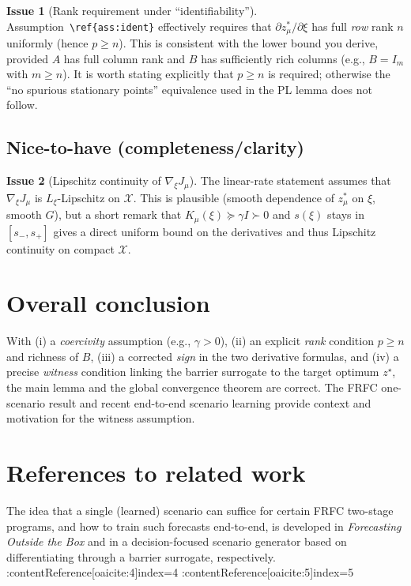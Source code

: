 \documentclass[11pt]{article}
\theoremstyle{definition}
\newtheorem{issue}{Issue}
\begin{document}
\begin{issue}[Rank requirement under ``identifiability'']
Assumption~\texttt{\textbackslash ref\{ass:ident\}} effectively requires that $\partial z_\mu^*/\partial \xi$ has full \emph{row} rank $n$ uniformly (hence $p\ge n$). This is consistent with the lower bound you derive, provided $A$ has full column rank and $B$ has sufficiently rich columns (e.g., $B=I_m$ with $m\ge n$). It is worth stating explicitly that $p\ge n$ is required; otherwise the ``no spurious stationary points'' equivalence used in the PL lemma does not follow.
\end{issue}

\subsection*{Nice-to-have (completeness/clarity)}
\begin{issue}[Lipschitz continuity of $\nabla_\xi J_\mu$]
The linear-rate statement assumes that $\nabla_\xi J_\mu$ is $L_\xi$-Lipschitz on $\mathcal X$. This is plausible (smooth dependence of $z^*_\mu$ on $\xi$, smooth $G$), but a short remark that $K_\mu(\xi)\succeq \gamma I\succ0$ and $s(\xi)$ stays in $[s_-,s_+]$ gives a direct uniform bound on the derivatives and thus Lipschitz continuity on compact $\mathcal X$. 
\end{issue}

\section*{Overall conclusion}
With (i) a \emph{coercivity} assumption (e.g., $\gamma>0$), (ii) an explicit \emph{rank} condition $p\ge n$ and richness of $B$, (iii) a corrected \emph{sign} in the two derivative formulas, and (iv) a precise \emph{witness} condition linking the barrier surrogate to the target optimum $z^\star$, the main lemma and the global convergence theorem are correct. The FRFC one-scenario result \cite{FOTB} and recent end-to-end scenario learning \cite{DFS} provide context and motivation for the witness assumption.

\section*{References to related work}
The idea that a single (learned) scenario can suffice for certain FRFC two-stage programs, and how to train such forecasts end-to-end, is developed in \emph{Forecasting Outside the Box} and in a decision-focused scenario generator based on differentiating through a barrier surrogate, respectively. :contentReference[oaicite:4]{index=4} :contentReference[oaicite:5]{index=5}
\end{document}
